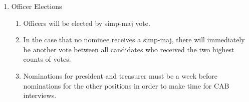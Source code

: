 \begin{enumerate}
		\item Officer Elections
		\begin{enumerate}
			\item Officers will be elected by \gls{simp-maj} vote.

			\item In the case that no nominee receives a \gls{simp-maj}, there will immediately be another vote between all candidates who received the two highest counts of votes.
            \item Nominations for president and treasurer must be a week before nominations for the other positions in order to make time for CAB interviews. %
		\end{enumerate}

	\end{enumerate}
